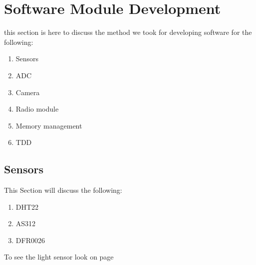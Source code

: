 \section{Software Module Development}
this section is here to discuss the method we took  for  developing software  for the  following:
\begin{enumerate}
    \item Sensors 
    \item ADC
    \item Camera
    \item Radio module
    \item Memory management
    \item  TDD
\end{enumerate}
\subsection{Sensors}
This Section will discuss the following:
\begin{enumerate}
    \item DHT22
    \item AS312
    \item DFR0026
\end{enumerate}
To see the light sensor look on page \pageref{ADC section} 
